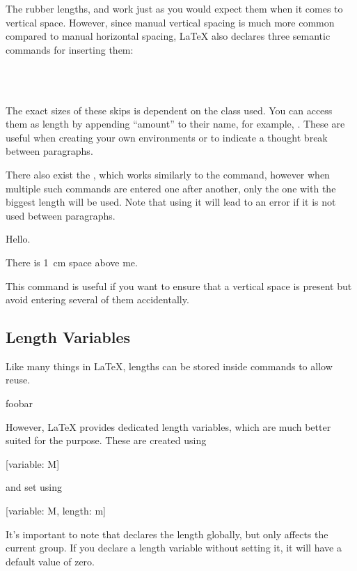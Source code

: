 The rubber lengths,  and  work just as you would expect
them when it comes to vertical space. However, since manual vertical spacing is
much more common compared to manual horizontal spacing, \LaTeX{} also declares
three semantic commands for inserting them:
\begin{lscommand}
   \\
   \\
\end{lscommand}
The exact sizes of these skips is dependent on the class used. You can access
them as length by appending \enquote{amount} to their name, for example,
. These are useful when creating your own environments or to
indicate a thought break between paragraphs.

There also exist the , which works similarly to the
 command, however when multiple such commands are entered one after
another, only the one with the biggest length will be used. Note that using it
will lead to an error if it is not used between paragraphs.
\begin{example}
Hello.

\addvspace{1pt}
\addvspace{1em}
\addvspace{1cm}
There is \qty{1}{\cm} space
above me.
\end{example}
This command is useful if you want to ensure that a vertical space is present
but avoid entering several of them accidentally.

\subsection{Length Variables}

Like many things in \LaTeX, lengths can be stored inside commands to allow
reuse.
\begin{example}
\NewDocumentCommand{%
  \mylength}{}{2em}
foo\hspace{\mylength}bar
\end{example}
However, \LaTeX{} provides dedicated length variables, which are much better
suited for the purpose. These are created using
\begin{lscommand}
  [variable: M]
\end{lscommand}
and set using
\begin{lscommand}
  [variable: M, length: m]
\end{lscommand}
It's important to note that  declares the length globally, but
 only affects the current group. If you declare a length
variable without setting it, it will have a default value of zero.

